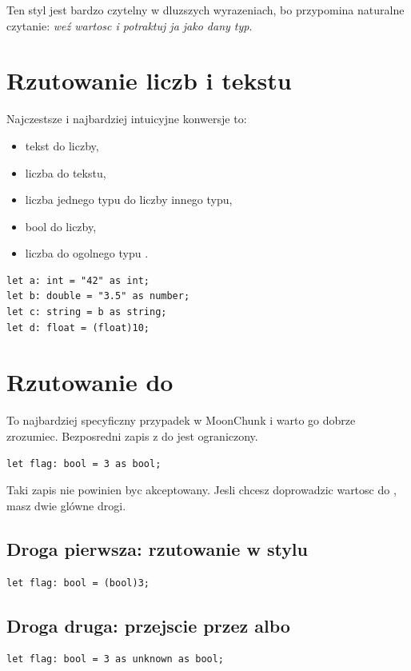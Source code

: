 Ten styl jest bardzo czytelny w dluzszych wyrazeniach, bo przypomina naturalne czytanie:
\emph{weź wartosc i potraktuj ja jako dany typ}.

\section{Rzutowanie liczb i tekstu}
Najczestsze i najbardziej intuicyjne konwersje to:

\begin{itemize}
  \item tekst do liczby,
  \item liczba do tekstu,
  \item liczba jednego typu do liczby innego typu,
  \item bool do liczby,
  \item liczba do ogolnego typu .
\end{itemize}

\begin{lstlisting}[style=moonchunk,caption={Czeste rzutowania}]
let a: int = "42" as int;
let b: double = "3.5" as number;
let c: string = b as string;
let d: float = (float)10;
\end{lstlisting}

\section{Rzutowanie do }
To najbardziej specyficzny przypadek w MoonChunk i warto go dobrze zrozumiec.
Bezposredni zapis z  do  jest ograniczony.

\begin{lstlisting}[style=moonchunk,caption={Niedozwolone bezposrednie rzutowanie przez as}]
let flag: bool = 3 as bool;
\end{lstlisting}

Taki zapis nie powinien byc akceptowany. Jesli chcesz doprowadzic wartosc do ,
masz dwie glówne drogi.

\subsection*{Droga pierwsza: rzutowanie w stylu }
\begin{lstlisting}[style=moonchunk,caption={Rzutowanie do bool przez zapis nawiasowy}]
let flag: bool = (bool)3;
\end{lstlisting}

\subsection*{Droga druga: przejscie przez  albo }
\begin{lstlisting}[style=moonchunk,caption={Most przez unknown}]
let flag: bool = 3 as unknown as bool;
\end{lstlisting}

